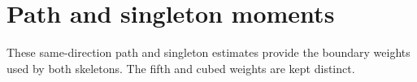 \section{Path and singleton moments}\label{app:path-moments}
These same-direction path and singleton estimates provide the boundary weights used by both skeletons. The fifth and cubed weights are kept distinct.





